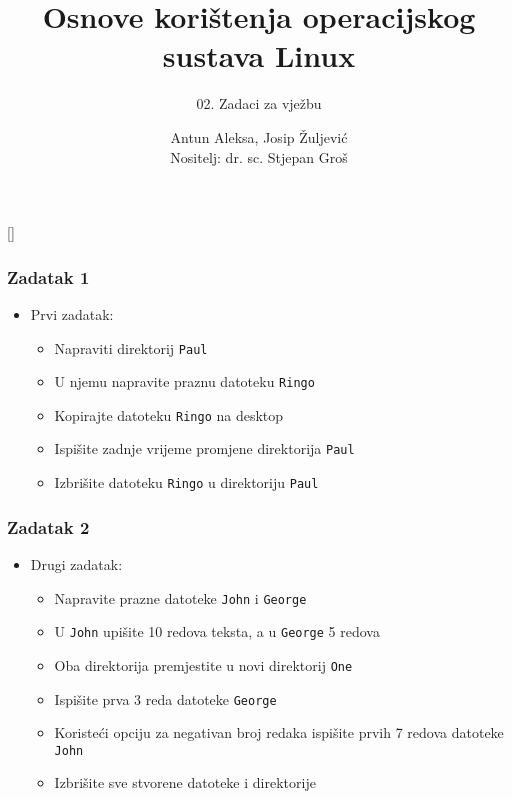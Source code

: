\documentclass{beamer}
\title{Osnove korištenja operacijskog sustava Linux}
\subtitle{02. Zadaci za vježbu}
\author[Antun Aleksa, Josip Žuljević]{Antun Aleksa, Josip Žuljević\\{\small Nositelj: dr. sc. Stjepan Groš}}
\institute[FER]{Sveučilište u Zagrebu \\
				Fakultet elektrotehnike i računarstva}
\date{\todayiso}
\newcommand{\shell}[1]{\texttt{#1}}
\begin{document}
{
[] %

\begin{frame}
\maketitle
\end{frame}
}

\begin{frame}[t]
\frametitle{Zadatak 1}
\begin{itemize}
  \item Prvi zadatak:
  \begin{itemize}
		\item Napraviti direktorij \shell{Paul}
		\item U njemu napravite praznu datoteku \shell{Ringo}
		\item Kopirajte datoteku \shell{Ringo} na desktop
		\item Ispišite zadnje vrijeme promjene direktorija \shell{Paul}
		\item Izbrišite datoteku \shell{Ringo} u direktoriju \shell{Paul}
  \end{itemize}
\end{itemize}
\end{frame}

\begin{frame}[t]
\frametitle{Zadatak 2}
\begin{itemize}
	\item Drugi zadatak:
	\begin{itemize}
		\item Napravite prazne datoteke \shell{John} i \shell{George}
		\item U \shell{John} upišite 10 redova teksta, a u \shell{George} 5 redova
		\item Oba direktorija premjestite u novi direktorij \shell{One}
		\item Ispišite prva 3 reda datoteke \shell{George}
		\item Koristeći opciju za negativan broj redaka ispišite prvih 7 redova datoteke \shell{John}
		\item Izbrišite sve stvorene datoteke i direktorije
	\end{itemize}
\end{itemize}
\end{frame}
\end{document}
